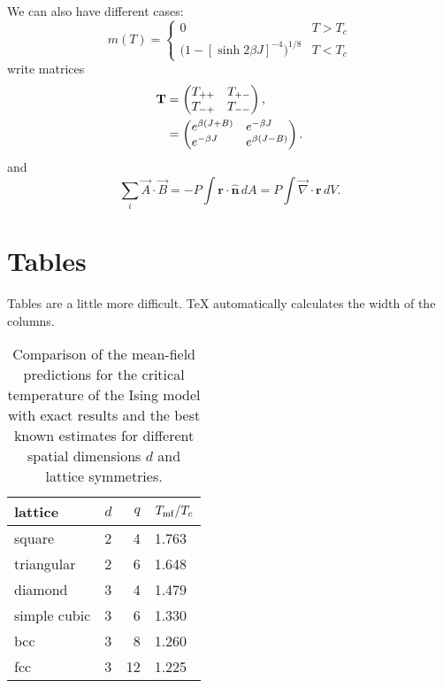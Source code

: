 \documentclass[12pt]{article}
\begin{document}
   We can also have different cases:
   \begin{equation}
	   \label{eq:mdiv}
	   m(T) =
	   \begin{cases}
		   0 & \text{$T > T_c$} \\
		   \bigl(1 - [\sinh 2 \beta J]^{-4} \bigr)^{\! 1/8} & \text{$T < T_c$}
	   \end{cases}
   \end{equation}
   write matrices
   \begin{align}
	   \textbf{T} &=
	   \begin{pmatrix}
		   T_{++} \hfill & T_{+-} \\
		   T_{-+} & T_{--} \hfill 
	   \end{pmatrix} , \nonumber \\
		      & =
		      \begin{pmatrix}
			      e^{\beta (J + B)} \hfill & e^{-\beta J} \hfill \\
			      e^{-\beta J} \hfill & e^{\beta (J - B)} \hfill
		      \end{pmatrix}.
   \end{align}
   and 
   \newcommand{\rv}{\textbf{r}}
   \begin{equation}
	   \sum_i \vec A \cdot \vec B = -P\!\int\! \rv \cdot
	   \hat{\mathbf{n}}\, dA = P\!\int \! {\vec \nabla} \cdot \rv\, dV.
   \end{equation}

   \section{Tables}
   Tables are a little more difficult. TeX
   automatically calculates the width of the columns.

   \begin{table}[h]
	   \begin{center}
		   \begin{tabular}{|l|l|r|l|}
			   \hline
			   lattice & $d$ & $q$ & $T_{\rm mf}/T_c$ \\
			   \hline
			   square & 2 & 4 & 1.763 \\
			   \hline
			   triangular & 2 & 6 & 1.648 \\
			   \hline
			   diamond & 3 & 4 & 1.479 \\
			   \hline
			   simple cubic & 3 & 6 & 1.330 \\
			   \hline
			   bcc & 3 & 8 & 1.260 \\
			   \hline
			   fcc & 3 & 12 & 1.225 \\
			   \hline
		   \end{tabular}
		   \caption{\label{tab:5/tc}Comparison of the mean-field predictions
			   for the critical temperature of the Ising model with exact results
			   and the best known estimates for different spatial dimensions $d$
		   and lattice symmetries.}
	   \end{center}
   \end{table}
\end{document}
